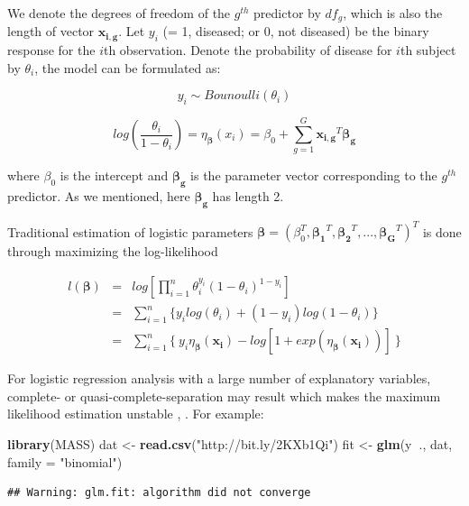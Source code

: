 \documentclass[12pt,]{krantz}
\makeatletter
\newenvironment{Shaded}{\begin{snugshade}}{\end{snugshade}}
\newcommand{\DataTypeTok}[1]{\textcolor[rgb]{0.27,0.27,0.27}{#1}}
\newcommand{\KeywordTok}[1]{\textcolor[rgb]{0.27,0.27,0.27}{\textbf{#1}}}
\newcommand{\NormalTok}[1]{#1}
\newcommand{\OperatorTok}[1]{\textcolor[rgb]{0.43,0.43,0.43}{\textbf{#1}}}
\newcommand{\StringTok}[1]{\textcolor[rgb]{0.5,0.5,0.5}{#1}}
\newenvironment{kframe}{%
\medskip{}
\setlength{\fboxsep}{.8em}
 \def\at@end@of@kframe{}%
 \ifinner\ifhmode%
  \def\at@end@of@kframe{\end{minipage}}%
  \begin{minipage}{\columnwidth}%
 \fi\fi%
 \def\FrameCommand##1{\hskip\@totalleftmargin \hskip-\fboxsep
 \colorbox{shadecolor}{##1}\hskip-\fboxsep
     \hskip-\linewidth \hskip-\@totalleftmargin \hskip\columnwidth}%
 \MakeFramed {\advance\hsize-\width
   \@totalleftmargin\z@ \linewidth\hsize
   \@setminipage}}%
 {\par\unskip\endMakeFramed%
 \at@end@of@kframe}
\renewenvironment{Shaded}{\begin{kframe}}{\end{kframe}}
\makeatother
\begin{document}
We denote the degrees of freedom of the \(g^{th}\) predictor by \(df_g\), which is also the length of vector \(\mathbf{x_{i,g}}\). Let \(y_i\) (= 1, diseased; or 0, not diseased) be the binary response for the \(i\)th observation. Denote the probability
of disease for \(i\)th subject by \(\theta_i\), the model can be formulated as:

\[y_{i}\sim Bounoulli(\theta_{i})\]

\[log\left(\frac{\theta_{i}}{1-\theta_{i}}\right)=\eta_{\symbf{\beta}}(x_{i})=\beta_{0}+\sum_{g=1}^{G}\mathbf{x_{i,g}}^{T}\symbf{\beta_{g}}\]

where \(\beta_{0}\) is the intercept and \(\symbf{\beta_{g}}\) is the parameter vector corresponding to the \(g^{th}\) predictor. As we mentioned, here \(\symbf{\beta_{g}}\) has length 2.

Traditional estimation of logistic
parameters \(\symbf{\beta}=(\beta_{0}^{T},\symbf{\beta_{1}}^{T},\symbf{\beta_{2}}^{T},...,\symbf{\beta_{G}}^{T})^{T}\) is done through maximizing the log-likelihood

\begin{eqnarray*}
l(\symbf{\beta})&=&log[\prod_{i=1}^{n}\theta_{i}^{y_{i}}(1-\theta_{i})^{1-y_{i}}]\\
&=&\sum_{i=1}^{n}\{y_{i}log(\theta_{i})+(1-y_{i})log(1-\theta_{i})\}\\
&=&\sum_{i=1}^{n}\{\ y_{i}\eta_{\symbf{\beta}}(\mathbf{x_{i}})-log[1+exp(\eta_{\symbf{\beta}}(\mathbf{x_{i}}))]\ \}
\label{eq:logisticlikelihood}
\end{eqnarray*}

For logistic regression analysis with a large number of explanatory variables, complete- or quasi-complete-separation may result which makes
the maximum likelihood estimation unstable \citep{Wed1976}, \citep{albert1984}. For example:

\begin{Shaded}
\begin{Highlighting}[]
\KeywordTok{library}\NormalTok{(MASS)}
\NormalTok{dat <-}\StringTok{ }\KeywordTok{read.csv}\NormalTok{(}\StringTok{"http://bit.ly/2KXb1Qi"}\NormalTok{)}
\NormalTok{fit <-}\StringTok{ }\KeywordTok{glm}\NormalTok{(y}\OperatorTok{~}\NormalTok{., dat, }\DataTypeTok{family =} \StringTok{"binomial"}\NormalTok{)}
\end{Highlighting}
\end{Shaded}

\begin{verbatim}
## Warning: glm.fit: algorithm did not converge
\end{verbatim}
\end{document}
